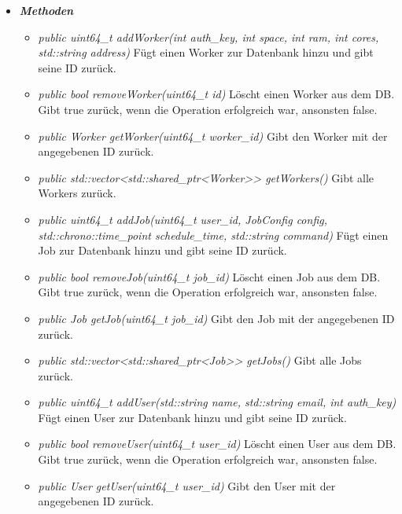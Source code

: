 \documentclass[a4paper,12pt]{article}
\begin{document}
	\begin{itemize}[label={}]
	
		\item \textit{\textbf{Methoden}}
			\begin{itemize}[label={\textbullet}]
				\item \textit{public uint64\_t addWorker(int auth\_key, int space, int ram, int cores, std::string address)} Fügt einen Worker zur Datenbank hinzu und gibt seine ID zurück.
				
				\item \textit{public bool removeWorker(uint64\_t id)} Löscht einen Worker aus dem DB. Gibt true zurück, wenn die Operation erfolgreich war, ansonsten false.
				
				\item \textit{public Worker getWorker(uint64\_t worker\_id)} Gibt den Worker mit der angegebenen ID zurück.
				
				\item \textit{public std::vector<std::shared\_ptr<Worker>> getWorkers()} Gibt alle Workers zurück.
				
				\item \textit{public uint64\_t addJob(uint64\_t user\_id, JobConfig config, std::chrono::time\_point schedule\_time, std::string command)} Fügt einen Job zur Datenbank hinzu und gibt seine ID zurück. 
				
				\item \textit{public bool removeJob(uint64\_t job\_id)} Löscht einen Job aus dem DB. Gibt true zurück, wenn die Operation erfolgreich war, ansonsten false.
				
				\item \textit{public Job getJob(uint64\_t job\_id)} Gibt den Job mit der angegebenen ID zurück.
				
				\item \textit{public std::vector<std::shared\_ptr<Job>> getJobs()} Gibt alle Jobs zurück.
				
				\item \textit{public uint64\_t addUser(std::string name, std::string email, int auth\_key)} Fügt einen User zur Datenbank hinzu und gibt seine ID zurück. 
				
				\item \textit{public bool removeUser(uint64\_t user\_id)} Löscht einen User aus dem DB. Gibt true zurück, wenn die Operation erfolgreich war, ansonsten false.
				
				\item \textit{public User getUser(uint64\_t user\_id)} Gibt den User mit der angegebenen ID zurück.
				

\end{itemize}
\end{itemize}
\end{document}
